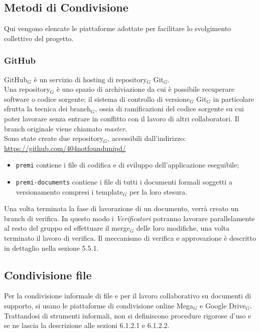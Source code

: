 \subsection{Metodi di Condivisione}
Qui vengono elencate le piattaforme adottate per facilitare lo svolgimento collettivo del progetto.

\subsubsection{GitHub}
GitHub$_G$ è un servizio di hosting di repository$_G$ Git$_G$. \\
Una repository$_G$ è uno spazio di archiviazione da cui è possibile recuperare software o codice sorgente; il sistema di controllo di versione$_G$ Git$_G$ in particolare sfrutta la tecnica dei branch$_G$, ossia di ramificazioni del codice sorgente su cui poter lavorare senza  entrare in conflitto con il lavoro di altri collaboratori. Il branch originale viene chiamato \textit{master}. \\
Sono state create due repository$_G$, accessibili dall'indirizzo:\\ 
\url{https://github.com/404notfoundunipd/}
\begin{itemize}
\item \texttt{premi} contiene i file di codifica e di sviluppo dell'applicazione eseguibile;
\item \texttt{premi-documents} contiene i file di tutti i documenti formali soggetti a versionamento compresi i template$_G$ per la loro stesura.
\end{itemize}

Una volta terminata la fase di lavorazione di un documento, verrà creato un branch
di verifica. In questo modo i \textit{Verificatori} potranno lavorare parallelamente al resto del gruppo ed effettuare il merge$_G$ delle loro modifiche, una volta terminato il lavoro di verifica.
Il meccanismo di verifica e approvazione è descritto in dettaglio nella sezione 5.5.1.

\subsection{Condivisione file}
Per la condivisione informale di file e per il lavoro collaborativo su documenti di supporto, si usano le piattaforme di condivisione online Mega$_G$ e Google Drive$_G$.
Trattandosi di strumenti informali, non si definiscono procedure rigorose d’uso e se ne
lascia la descrizione alle sezioni 6.1.2.1 e 6.1.2.2.